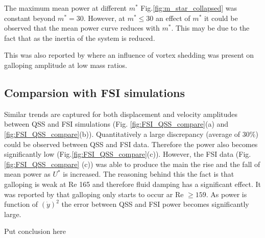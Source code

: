  

The maximum mean power at different $m^*$ Fig.\ref{fig:m_star_collapsed} was constant beyond $m^*=30$. However, at $m^* \leq 30$ an effect of $m^*$ it could be observed that the mean power curve reduces with $m^*$. This may be due to the fact that as the inertia of the system is reduced.  

 
 
 This was also reported by \cite{Joly2012} where an influence of vortex shedding was present on galloping amplitude at low mass ratios. 



 

\subsection{Comparsion with FSI simulations}
 Similar trends are captured for both displacement and velocity amplitudes between QSS and FSI simulations (Fig. \ref{fig:FSI_QSS_compare}(a) and \ref{fig:FSI_QSS_compare}(b)). Quantitatively a large discrepancy (average of $30\%$) could be observed between QSS and FSI data. Therefore the power also becomes significantly low (Fig.\ref{fig:FSI_QSS_compare}(c)). However, the FSI data (Fig.\ref{fig:FSI_QSS_compare} (c)) was able to produce the main the rise and the fall of mean power as $U^*$ is increased. The reasoning behind this the fact is that galloping is weak at Re 165  and therefore fluid damping has a significant effect. It was reported by \cite{Barrero-Gil2009} that galloping only starts to occur ar Re $\geq 159$. As power is function of $(\dot{y})^2$ the error between QSS and FSI power becomes significantly large.  
 
 Put conclusion here 
 
 










 

 
 
 

 
 



 
 
 
 
 
 
 
 
 
 
  
 
 